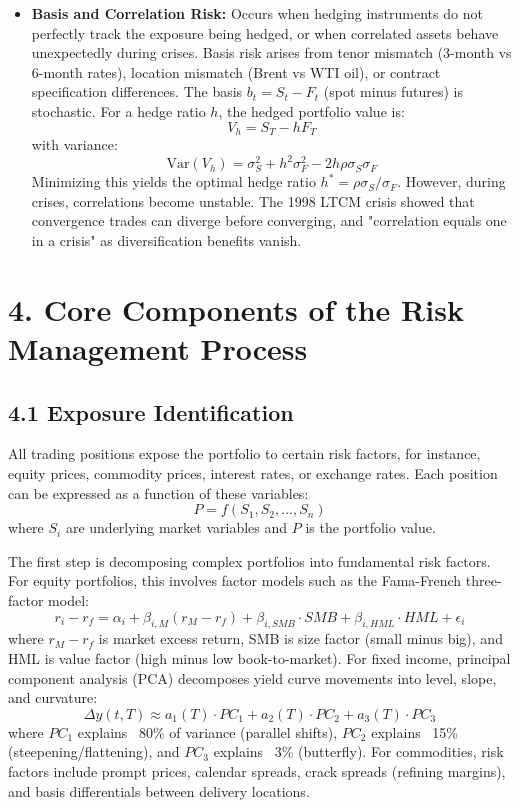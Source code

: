 \documentclass[11pt,a4paper]{article}
\begin{document}
\begin{itemize}
    \item \textbf{Basis and Correlation Risk:} Occurs when hedging instruments do not perfectly track the exposure being hedged, or when correlated assets behave unexpectedly during crises. Basis risk arises from tenor mismatch (3-month vs 6-month rates), location mismatch (Brent vs WTI oil), or contract specification differences. The basis $b_t = S_t - F_t$ (spot minus futures) is stochastic. For a hedge ratio $h$, the hedged portfolio value is:
    \[
    V_h = S_T - h F_T
    \]
    with variance:
    \[
    \text{Var}(V_h) = \sigma_S^2 + h^2\sigma_F^2 - 2h\rho\sigma_S\sigma_F
    \]
    Minimizing this yields the optimal hedge ratio $h^* = \rho\sigma_S/\sigma_F$. However, during crises, correlations become unstable. The 1998 LTCM crisis showed that convergence trades can diverge before converging, and "correlation equals one in a crisis" as diversification benefits vanish.
\end{itemize}

\section*{4. Core Components of the Risk Management Process}

\subsection*{4.1 Exposure Identification}

All trading positions expose the portfolio to certain risk factors, for instance, equity prices, commodity prices, interest rates, or exchange rates. Each position can be expressed as a function of these variables:
\[
P = f(S_1, S_2, \ldots, S_n)
\]
where $S_i$ are underlying market variables and $P$ is the portfolio value.

The first step is decomposing complex portfolios into fundamental risk factors. For equity portfolios, this involves factor models such as the Fama-French three-factor model:
\[
r_i - r_f = \alpha_i + \beta_{i,M}(r_M - r_f) + \beta_{i,SMB} \cdot SMB + \beta_{i,HML} \cdot HML + \epsilon_i
\]
where $r_M - r_f$ is market excess return, SMB is size factor (small minus big), and HML is value factor (high minus low book-to-market). For fixed income, principal component analysis (PCA) decomposes yield curve movements into level, slope, and curvature:
\[
\Delta y(t,T) \approx a_1(T)\cdot PC_1 + a_2(T)\cdot PC_2 + a_3(T)\cdot PC_3
\]
where $PC_1$ explains ~80\% of variance (parallel shifts), $PC_2$ explains ~15\% (steepening/flattening), and $PC_3$ explains ~3\% (butterfly). For commodities, risk factors include prompt prices, calendar spreads, crack spreads (refining margins), and basis differentials between delivery locations.
\end{document}
